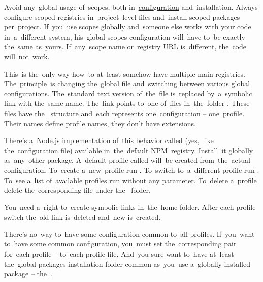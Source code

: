 \warning Avoid any~global usage of~scopes, both in~\hyperref[npmconfiguration]{configuration} and~installation.
Always configure scoped registries in~project--level  files and~install scoped packages per~project.
If~you~use scopes globally and~someone else works with your code in~a~different system, his~global scopes configuration will~have to~be exactly the~same as~yours.
If~any~scope name or~registry URL is~different, the~code will~not~work.

\enlargethispage{10mm}
\thispagestyle{empty}
\label{npmprofile}
This~is the~only way how~to at~least somehow have multiple main registries.
The~principle~is changing the~global  file and~switching between various global configurations.
The~standard text version of~the~file is~replaced by~a~symbolic link with the~same name.
The~link points to~one of~files in~the~folder .
These files have the~ structure and~each represents one~configuration -- one~profile.
Their names define profile names, they don't have extensions.

There's a~Node.js implementation of~this behavior called  (yes,~like the~configuration file) available in~the~default NPM~registry.
Install~it globally as~any~other package.
A~default profile called  will~be created from~the~actual configuration.
To~create a~new~profile run .
To~switch to~a~different profile run .
To~see a~list of~available profiles run  without any parameter.
To~delete a~profile delete the~corresponding file under the~ folder.
\newpage

\warning You~need a~right to~create symbolic links in~the~home folder.
After each profile switch the~old  link is~deleted and~new is~created.

\warning There's no~way to~have some configuration common to~all profiles.
If~you~want to~have some common configuration, you~must set the~corresponding  pair for~each profile -- to~each profile file.
And~you sure want to~have at~least the~global packages installation folder common as~you~use a~globally installed package -- the~.

